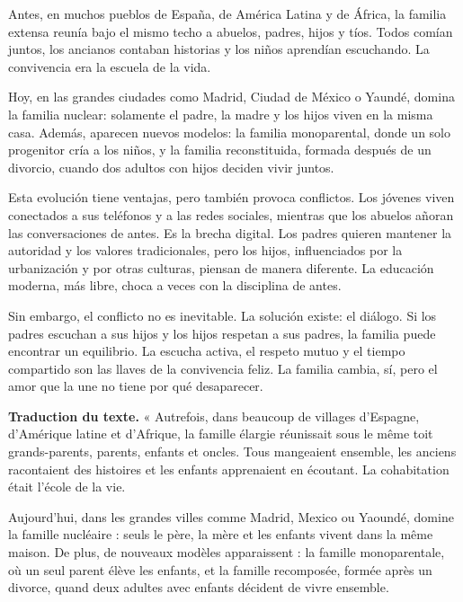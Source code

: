 \documentclass[11pt]{article}
\newcounter{popsec}
\newcounter{popsub}
\newcommand{\courssub}[1]{%
  \stepcounter{popsub}%
  \par\vspace{9pt}\noindent{\popxbold\fontsize{11.5}{13}\selectfont\color{popink}{\color{poporange}\thepopsec.\thepopsub}\hspace{6pt}#1}\par\nopagebreak\vspace{4pt}
}
\begin{document}
\courssub{Lecture du texte}

\begin{textebox}
Antes, en muchos pueblos de España, de América Latina y de África, la familia extensa reunía bajo el mismo techo a abuelos, padres, hijos y tíos. Todos comían juntos, los ancianos contaban historias y los niños aprendían escuchando. La convivencia era la escuela de la vida.

Hoy, en las grandes ciudades como Madrid, Ciudad de México o Yaundé, domina la familia nuclear: solamente el padre, la madre y los hijos viven en la misma casa. Además, aparecen nuevos modelos: la familia monoparental, donde un solo progenitor cría a los niños, y la familia reconstituida, formada después de un divorcio, cuando dos adultos con hijos deciden vivir juntos.

Esta evolución tiene ventajas, pero también provoca conflictos. Los jóvenes viven conectados a sus teléfonos y a las redes sociales, mientras que los abuelos añoran las conversaciones de antes. Es la brecha digital. Los padres quieren mantener la autoridad y los valores tradicionales, pero los hijos, influenciados por la urbanización y por otras culturas, piensan de manera diferente. La educación moderna, más libre, choca a veces con la disciplina de antes.

Sin embargo, el conflicto no es inevitable. La solución existe: el diálogo. Si los padres escuchan a sus hijos y los hijos respetan a sus padres, la familia puede encontrar un equilibrio. La escucha activa, el respeto mutuo y el tiempo compartido son las llaves de la convivencia feliz. La familia cambia, sí, pero el amor que la une no tiene por qué desaparecer.
\end{textebox}

\textbf{Traduction du texte.} « Autrefois, dans beaucoup de villages d'Espagne, d'Amérique latine et d'Afrique, la famille élargie réunissait sous le même toit grands-parents, parents, enfants et oncles. Tous mangeaient ensemble, les anciens racontaient des histoires et les enfants apprenaient en écoutant. La cohabitation était l'école de la vie.

Aujourd'hui, dans les grandes villes comme Madrid, Mexico ou Yaoundé, domine la famille nucléaire : seuls le père, la mère et les enfants vivent dans la même maison. De plus, de nouveaux modèles apparaissent : la famille monoparentale, où un seul parent élève les enfants, et la famille recomposée, formée après un divorce, quand deux adultes avec enfants décident de vivre ensemble.
\end{document}
